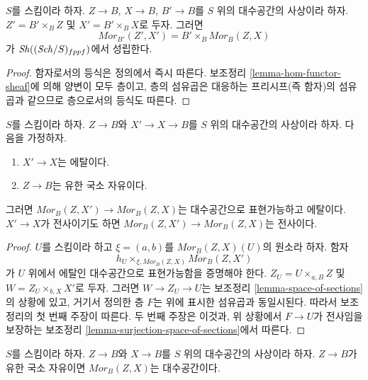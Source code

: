 \begin{lemma}
\label{lemma-base-change-hom-functor}
$S$를 스킴이라 하자. $Z \to B$, $X \to B$, $B' \to B$를
$S$ 위의 대수공간의 사상이라 하자. $Z' = B' \times_B Z$ 및
$X' = B' \times_B X$로 두자. 그러면
$$
\mathit{Mor}_{B'}(Z', X')
=
B' \times_B \mathit{Mor}_B(Z, X)
$$
가 $\mathop{\mathit{Sh}}\nolimits((\mathit{Sch}/S)_{fppf})$에서 성립한다.
\end{lemma}

\begin{proof}
함자로서의 등식은 정의에서 즉시 따른다. 보조정리
\ref{lemma-hom-functor-sheaf}에 의해 양변이 모두 층이고,
층의 섬유곱은 대응하는 프리시프(즉 함자)의 섬유곱과 같으므로
층으로서의 등식도 따른다.
\end{proof}

\begin{lemma}
\label{lemma-etale-covering-hom-functor}
$S$를 스킴이라 하자. $Z \to B$와 $X' \to X \to B$를
$S$ 위의 대수공간의 사상이라 하자. 다음을 가정하자.
\begin{enumerate}
\item $X' \to X$는 에탈이다.
\item $Z \to B$는 유한 국소 자유이다.
\end{enumerate}
그러면 $\mathit{Mor}_B(Z, X') \to \mathit{Mor}_B(Z, X)$는
대수공간으로 표현가능하고 에탈이다. $X' \to X$가 전사이기도 하면
$\mathit{Mor}_B(Z, X') \to \mathit{Mor}_B(Z, X)$는 전사이다.
\end{lemma}

\begin{proof}
$U$를 스킴이라 하고 $\xi = (a, b)$를
$\mathit{Mor}_B(Z, X)(U)$의 원소라 하자. 함자
$$
h_U \times_{\xi, \mathit{Mor}_B(Z, X)} \mathit{Mor}_B(Z, X')
$$
가 $U$ 위에서 에탈인 대수공간으로 표현가능함을 증명해야 한다.
$Z_U = U \times_{a, B} Z$ 및 $W = Z_U \times_{b, X} X'$로 두자.
그러면 $W \to Z_U \to U$는 보조정리
\ref{lemma-space-of-sections}의 상황에 있고, 거기서 정의한 층 $F$는
위에 표시한 섬유곱과 동일시된다. 따라서 보조정리의 첫 번째 주장이
따른다. 두 번째 주장은 이것과, 위 상황에서 $F \to U$가 전사임을
보장하는 보조정리 \ref{lemma-surjection-space-of-sections}에서 따른다.
\end{proof}

\begin{proposition}
\label{proposition-hom-functor-algebraic-space}
$S$를 스킴이라 하자. $Z \to B$와 $X \to B$를 $S$ 위의
대수공간의 사상이라 하자. $Z \to B$가 유한 국소 자유이면
$\mathit{Mor}_B(Z, X)$는 대수공간이다.
\end{proposition}

